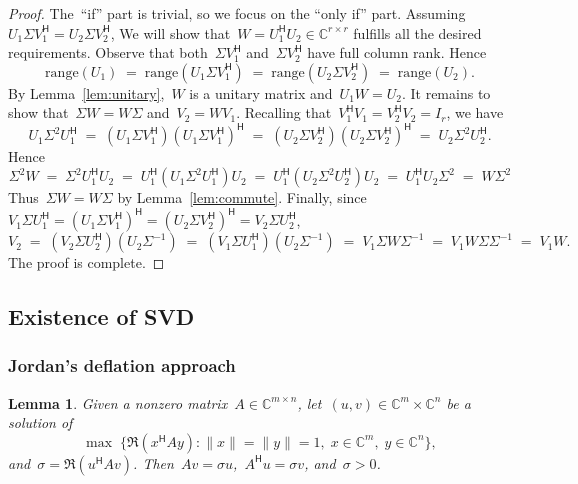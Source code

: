 \documentclass[11pt,a4paper]{article}
\newtheorem{lemma}{Lemma}%
\theoremstyle{definition}
\def\CC{\mathbb{C}}
\newcommand{\hmt}{{\scriptscriptstyle{{\mathsf{H}}}}}
\newcommand{\range}{\mathrm{range}}
\begin{document}
\begin{proof}
The~``if'' part is trivial, so we focus on the ``only if'' part.
Assuming~$U_1\Sigma V_1^\hmt = U_2\Sigma V_2^\hmt$,
We will show that~$W = U_1^\hmt U_2\in \CC^{r\times r}$ fulfills all the desired requirements.
Observe that both~$\Sigma V_1^\hmt$ and~$\Sigma V_2^\hmt$ have full column rank. Hence
\begin{equation*}
  \range(U_1) \;=\; \range(U_1\Sigma V_1^\hmt) 
  \;=\; \range(U_2\Sigma V_2^\hmt) \;=\; \range(U_2).
\end{equation*}
By Lemma~\ref{lem:unitary},~$W$ is a unitary matrix and~$U_1W = U_2$. 
It remains to show that~$\Sigma W = W\Sigma$ and~$V_2 = WV_1$. 
Recalling that~$V_1^\hmt V_1 = V_2^\hmt V_2= I_r$, we have
\begin{equation}
  \nonumber
  U_1\Sigma^2 U_1^\hmt 
  \;=\; (U_1\Sigma V_1^\hmt) (U_1 \Sigma V_1^\hmt)^\hmt 
  \;=\; (U_2\Sigma V_2^\hmt) (U_2 \Sigma V_2^\hmt)^\hmt 
  \;=\; U_2\Sigma^2 U_2^\hmt. 
\end{equation}
Hence
\begin{equation*}
  \Sigma^2W 
  \;=\;\Sigma^2U_1^\hmt U_2 
  \;=\; U_1^\hmt(U_1 \Sigma^2 U_1^\hmt) U_2
  \;=\; U_1^\hmt(U_2 \Sigma^2 U_2^\hmt) U_2
  \;=\; U_1^\hmt U_2 \Sigma^2 
  \;=\; W\Sigma^2 
\end{equation*}
Thus~$\Sigma W=W\Sigma$ by Lemma~\ref{lem:commute}. 
Finally, since~$V_1 \Sigma U_1^\hmt =(U_1\Sigma V_1^\hmt)^\hmt = (U_2\Sigma V_2^\hmt)^\hmt= V_2 \Sigma
U_2^\hmt$, 
\begin{equation*}
  V_2
  \;=\;(V_2\Sigma U_2^\hmt)(U_2 \Sigma^{-1}) 
  \;=\;(V_1\Sigma U_1^\hmt)(U_2 \Sigma^{-1}) 
  \;=\; V_1 \Sigma W \Sigma^{-1}
  \;=\; V_1 W \Sigma \Sigma^{-1}
  \;=\; V_1W.
\end{equation*}
The proof is complete.
\end{proof}


\subsection{Existence of SVD}

\subsubsection{Jordan's deflation approach~\cite{Jordan_1874}}

\begin{lemma}
  \label{lem:jordan}
  Given a nonzero matrix~$A\in\CC^{m\times n}$, let~$(u,v)\in \CC^{m}\times \CC^{n}$ be a solution of 
  \begin{equation}
    \nonumber
    \max\; \{\Re(x^\hmt A y) \mathrel{:} \|x\|=\|y\|=1, \; x \in \CC^{m}, \; y\in\CC^{n}\},
  \end{equation}
  and~${\sigma} = \Re(u^\hmt Av)$. Then~$Av = \sigma u$,~$A^\hmt u
  = \sigma v$, and~$\sigma>0$. 
\end{lemma}
\end{document}
